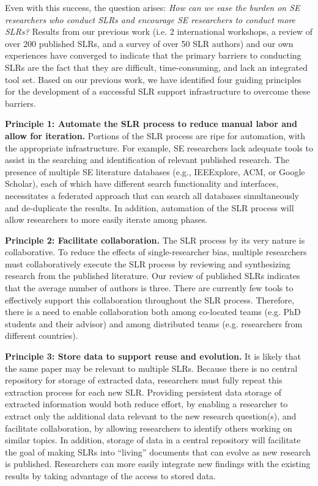 Even with this success, the question arises: \textit{How can we ease the burden on SE researchers who conduct SLRs and encourage SE researchers to conduct more SLRs?} 
Results from our previous work (i.e. 2 international workshops, a review of over 200 published SLRs, and a survey of over 50 SLR authors) and our own experiences have converged to indicate that the primary barriers to conducting SLRs are the fact that they are difficult, time-consuming, and lack an integrated tool set.  
Based on our previous work, we have identified four guiding principles for the development of a successful SLR support infrastructure to overcome these barriers.

\textbf{Principle 1: Automate the SLR process to reduce manual labor and allow for iteration.}
Portions of the SLR process are ripe for automation, with the appropriate infrastructure.
For example, SE researchers lack adequate tools to assist in the searching and identification of relevant published research.
The presence of multiple SE literature databases (e.g., IEEExplore, ACM, or Google Scholar), each of which have different search functionality and interfaces, necessitates a federated approach that can search all databases simultaneously and de-duplicate the results. 
In addition, automation of the SLR process will allow researchers to more easily iterate among phases.

\textbf{Principle 2: Facilitate collaboration.}
The SLR process by its very nature is collaborative.
To reduce the effects of single-researcher bias, multiple researchers must collaboratively execute the SLR process by reviewing and synthesizing research from the published literature.
Our review of published SLRs indicates that the average number of authors is three.
There are currently few tools to effectively support this collaboration throughout the SLR process.
Therefore, there is a need to enable collaboration both among co-located teams (e.g. PhD students and their advisor) and among distributed teams (e.g. researchers from different countries).

\textbf{Principle 3: Store data to support reuse and evolution.}
It is likely that the same paper may be relevant to multiple SLRs. 
Because there is no central repository for storage of extracted data, researchers must fully repeat this extraction process for each new SLR. 
Providing persistent data storage of extracted information would both reduce effort, by enabling a researcher to extract only the additional data relevant to the new research question(s), and facilitate collaboration, by allowing researchers to identify others working on similar topics.
In addition, storage of data in a central repository will facilitate the goal of making SLRs into ``living'' documents that can evolve as new research is published.
Researchers can more easily integrate new findings with the existing results by taking advantage of the access to stored data.

